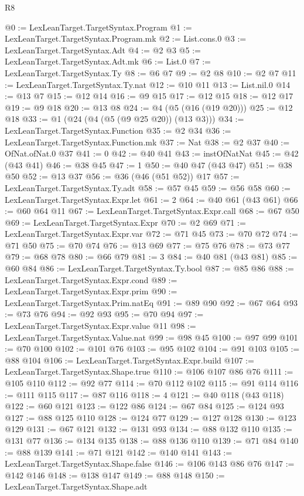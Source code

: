 \begin{lexlean}{R8}
\begin{coremodule}
@0 := LexLeanTarget.TargetSyntax.Program
@1 := LexLeanTarget.TargetSyntax.Program.mk
@2 := List.cons.{0}
@3 := LexLeanTarget.TargetSyntax.Adt
@4 := @2 @3
@5 := LexLeanTarget.TargetSyntax.Adt.mk
@6 := List.{0}
@7 := LexLeanTarget.TargetSyntax.Ty
@8 := @6 @7
@9 := @2 @8
@10 := @2 @7
@11 := LexLeanTarget.TargetSyntax.Ty.nat
@12 := @10 @11
@13 := List.nil.{0}
@14 := @13 @7
@15 := @12 @14
@16 := @9 @15
@17 := @12 @15
@18 := @12 @17
@19 := @9 @18
@20 := @13 @8
@24 := @4 (@5 (@16 (@19 @20)))
@25 := @12 @18
@33 := @1 (@24 (@4 (@5 (@9 @25 @20)) (@13 @3)))
@34 := LexLeanTarget.TargetSyntax.Function
@35 := @2 @34
@36 := LexLeanTarget.TargetSyntax.Function.mk
@37 := Nat
@38 := @2 @37
@40 := OfNat.ofNat.{0} @37
@41 := 0
@42 := @40 @41
@43 := instOfNatNat
@45 := @42 (@43 @41)
@46 := @38 @45
@47 := 1
@50 := @40 @47 (@43 @47)
@51 := @38 @50
@52 := @13 @37
@56 := @36 (@46 (@51 @52)) @17
@57 := LexLeanTarget.TargetSyntax.Ty.adt
@58 := @57 @45
@59 := @56 @58
@60 := LexLeanTarget.TargetSyntax.Expr.let
@61 := 2
@64 := @40 @61 (@43 @61)
@66 := @60 @64 @11
@67 := LexLeanTarget.TargetSyntax.Expr.call
@68 := @67 @50
@69 := LexLeanTarget.TargetSyntax.Expr
@70 := @2 @69
@71 := LexLeanTarget.TargetSyntax.Expr.var
@72 := @71 @45
@73 := @70 @72
@74 := @71 @50
@75 := @70 @74
@76 := @13 @69
@77 := @75 @76
@78 := @73 @77
@79 := @68 @78
@80 := @66 @79
@81 := 3
@84 := @40 @81 (@43 @81)
@85 := @60 @84
@86 := LexLeanTarget.TargetSyntax.Ty.bool
@87 := @85 @86
@88 := LexLeanTarget.TargetSyntax.Expr.cond
@89 := LexLeanTarget.TargetSyntax.Expr.prim
@90 := LexLeanTarget.TargetSyntax.Prim.natEq
@91 := @89 @90
@92 := @67 @64
@93 := @73 @76
@94 := @92 @93
@95 := @70 @94
@97 := LexLeanTarget.TargetSyntax.Expr.value @11
@98 := LexLeanTarget.TargetSyntax.Value.nat
@99 := @98 @45
@100 := @97 @99
@101 := @70 @100
@102 := @101 @76
@103 := @95 @102
@104 := @91 @103
@105 := @88 @104
@106 := LexLeanTarget.TargetSyntax.Expr.build
@107 := LexLeanTarget.TargetSyntax.Shape.true
@110 := @106 @107 @86 @76
@111 := @105 @110
@112 := @92 @77
@114 := @70 @112 @102
@115 := @91 @114
@116 := @111 @115
@117 := @87 @116
@118 := 4
@121 := @40 @118 (@43 @118)
@122 := @60 @121
@123 := @122 @86
@124 := @67 @84
@125 := @124 @93
@127 := @88 @125 @110
@128 := @124 @77
@129 := @127 @128
@130 := @123 @129
@131 := @67 @121
@132 := @131 @93
@134 := @88 @132 @110
@135 := @131 @77
@136 := @134 @135
@138 := @88 @136 @110
@139 := @71 @84
@140 := @88 @139
@141 := @71 @121
@142 := @140 @141
@143 := LexLeanTarget.TargetSyntax.Shape.false
@146 := @106 @143 @86 @76
@147 := @142 @146
@148 := @138 @147
@149 := @88 @148
@150 := LexLeanTarget.TargetSyntax.Shape.adt

\end{coremodule}
\end{lexlean}
